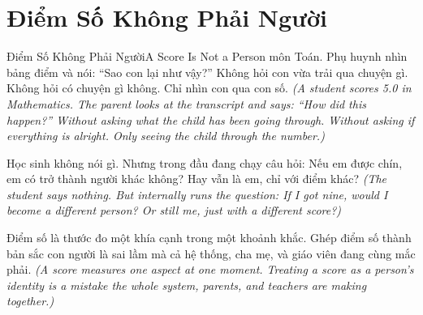 \section{Điểm Số Không Phải Người}
\begin{truyen}{Điểm Số Không Phải Người}{A Score Is Not a Person}
 môn Toán. Phụ huynh nhìn bảng điểm và nói: ``Sao con lại như vậy?'' Không hỏi con vừa trải qua chuyện gì. Không hỏi có chuyện gì không. Chỉ nhìn con qua con số.
\textit{(A student scores 5.0 in Mathematics. The parent looks at the transcript and says: ``How did this happen?'' Without asking what the child has been going through. Without asking if everything is alright. Only seeing the child through the number.)}


Học sinh không nói gì. Nhưng trong đầu đang chạy câu hỏi: Nếu em được chín, em có trở thành người khác không? Hay vẫn là em, chỉ với điểm khác?
\textit{(The student says nothing. But internally runs the question: If I got nine, would I become a different person? Or still me, just with a different score?)}

\begin{baihoc}
Điểm số là thước đo một khía cạnh trong một khoảnh khắc. Ghép điểm số thành bản sắc con người là sai lầm mà cả hệ thống, cha mẹ, và giáo viên đang cùng mắc phải.
\textit{(A score measures one aspect at one moment. Treating a score as a person's identity is a mistake the whole system, parents, and teachers are making together.)}
\end{baihoc}
\end{truyen}

